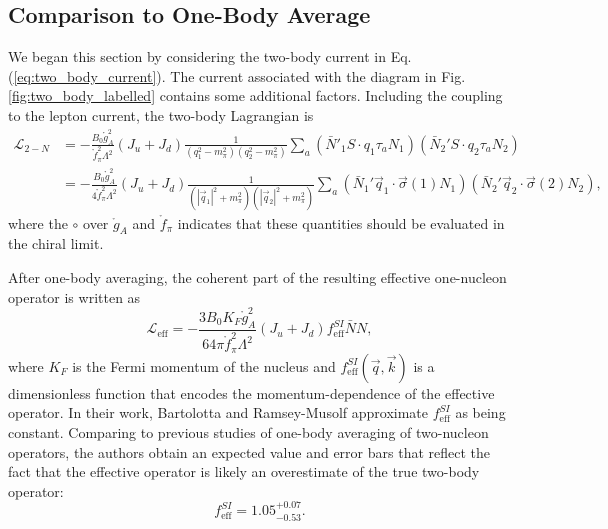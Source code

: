 \documentclass{book}[letterpaper,12pt]
\begin{document}
\subsection{Comparison to One-Body Average}
We began this section by considering the two-body current in Eq. (\ref{eq:two_body_current}). The current associated with the diagram in Fig. \ref{fig:two_body_labelled} contains some additional factors. Including the coupling to the lepton current, the two-body Lagrangian is
\begin{equation}
\begin{split}
\mathcal{L}_{2-N}&=-\frac{B_0 \mathring{g}_A^2}{\mathring{f}_{\pi}^2\Lambda^2}\left(J_u+J_d\right)\frac{1}{\left(q_1^2-m_{\pi}^2\right)\left(q_2^2-m_{\pi}^2\right)}\sum_a\left(\bar{N}'_1 S\cdot q_1\tau_a N_1\right)\left(\bar{N}_2' S\cdot q_2 \tau_a N_2\right)\\
&=-\frac{B_0\mathring{g}_A^2}{4\mathring{f}_{\pi}^2\Lambda^2}\left(J_u+J_d\right)\frac{1}{\left(|\vec{q}_1|^2+m_{\pi}^2\right)\left(|\vec{q}_2|^2+m_{\pi}^2\right)}\sum_a \left(\bar{N}_1' \vec{q}_1\cdot\vec{\sigma}(1) N_1 \right)\left(\bar{N}_2' \vec{q}_2\cdot\vec{\sigma}(2) N_2\right),
\end{split}
\end{equation}
where the $\circ$ over $\mathring{g}_A$ and $\mathring{f}_{\pi}$ indicates that these quantities should be evaluated in the chiral limit.

After one-body averaging, the coherent part of the resulting effective one-nucleon operator is written as
\begin{equation}
\mathcal{L}_\mathrm{eff}=-\frac{3B_0K_F \mathring{g}_A^2}{64\pi \mathring{f}_{\pi}^2\Lambda^2}\left(J_u+J_d\right)f_\mathrm{eff}^{SI}\bar{N}N,
\end{equation}
where $K_F$ is the Fermi momentum of the nucleus and $f_\mathrm{eff}^{SI}(\vec{q},\vec{k})$ is a dimensionless function that encodes the momentum-dependence of the effective operator. In their work, Bartolotta and Ramsey-Musolf approximate $f_\mathrm{eff}^{SI}$ as being constant. Comparing to previous studies of one-body averaging of two-nucleon operators, the authors obtain an expected value and error bars that reflect the fact that the effective operator is likely an overestimate of the true two-body operator:
\begin{equation}
f_\mathrm{eff}^{SI}=1.05^{+0.07}_{-0.53}.
\end{equation}
\end{document}
